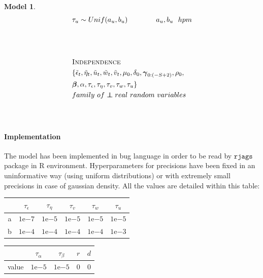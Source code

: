 \documentclass[11pt,twoside]{report}
\newcommand\independent{\protect\mathpalette{\protect\independenT}{\perp}}
\def\independenT#1#2{\mathrel{\rlap{$#1#2$}\mkern2mu{#1#2}}}
\newtheorem{model}{Model}
\begin{document}
\begin{model}
\begin{equation*}
\begin{aligned}[c]
	&\tau_u \sim Unif(a_u, b_u)\quad\quad\quad\quad a_u, b_u\ \ hpm\\
	&\\
	&\\
	&\\
	&\textsc{Independence}\\
	&\{\tilde{\epsilon}_t, \tilde{\eta}_t, \tilde{u}_t, \tilde{w}_t, \tilde{v}_t, \mu_0, \delta_0, \boldsymbol{\gamma}_{0:(-S+2)}, \rho_0,\\ &\boldsymbol{\beta}, \alpha, \tau_\epsilon, \tau_\eta, \tau_v, \tau_w, \tau_u\}\\ &family\ of \independent real\ random\ variables\\
	&\\
	&\\
\end{aligned}
\end{equation*}
\end{model}
\paragraph{Implementation}  The model has been implemented in bug language in order to be read by $ \texttt{rjags} $ package in R environment. Hyperparameters for precisions have been fixed in an uninformative way (using uniform distributions) or with extremely small precisions in case of gaussian density. All the values are detailed within this table:\\

\begin{table}[!htb]
	\begin{subtable}{.5\linewidth}
		\centering
\begin{tabular}{|c|c|c|c|c|c|}
	\hline
	& $ \tau_\epsilon $ & $ \tau_\eta $ &$  \tau_v $ & $ \tau_w $ & $ \tau_ u $\\
	\hline
	a &$  1\mathrm{e}{-7} $ & $  1\mathrm{e}{-5} $ &$  1\mathrm{e}{-5} $&$  1\mathrm{e}{-5} $&$  1\mathrm{e}{-5} $\\
	\hline
	b &$  1\mathrm{e}{-4} $ & $  1\mathrm{e}{-4} $ &$  1\mathrm{e}{-4} $&$  1\mathrm{e}{-4} $&$  1\mathrm{e}{-3} $\\
	\hline
\end{tabular} 
	\end{subtable}%
	\begin{subtable}{.5\linewidth}
		\centering
	\begin{tabular}{|c|c|c|c|c|}
		\hline
		& $ \tau_\alpha $ & $ \tau_\beta $ & $ r $ & $ d $\\
		\hline
		value &$  1\mathrm{e}{-5} $ & $  1\mathrm{e}{-5} $& 0 & 0\\
		\hline
	\end{tabular} 
	\end{subtable} 
\end{table}
\end{document}
